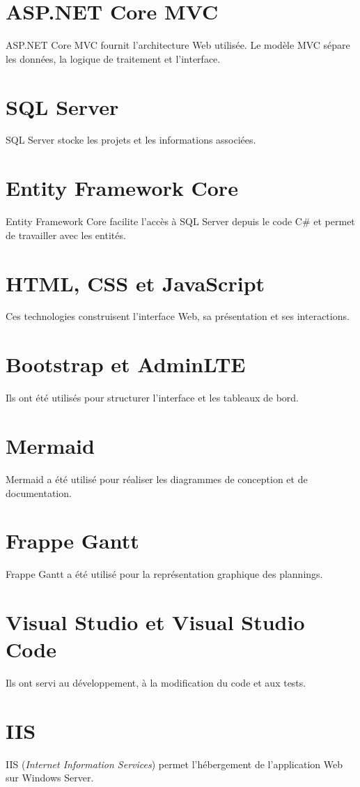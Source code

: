 \documentclass[12pt,a4paper,oneside]{report}
\begin{document}
\section{ASP.NET Core MVC}
ASP.NET Core MVC fournit l'architecture Web utilisée. Le modèle MVC sépare les données, la logique de traitement et l'interface.

\section{SQL Server}
SQL Server stocke les projets et les informations associées.

\section{Entity Framework Core}
Entity Framework Core facilite l'accès à SQL Server depuis le code C\# et permet de travailler avec les entités.

\section{HTML, CSS et JavaScript}
Ces technologies construisent l'interface Web, sa présentation et ses interactions.

\section{Bootstrap et AdminLTE}
Ils ont été utilisés pour structurer l'interface et les tableaux de bord.

\section{Mermaid}
Mermaid a été utilisé pour réaliser les diagrammes de conception et de documentation.

\section{Frappe Gantt}
Frappe Gantt a été utilisé pour la représentation graphique des plannings.

\section{Visual Studio et Visual Studio Code}
Ils ont servi au développement, à la modification du code et aux tests.

\section{IIS}
IIS (\textit{Internet Information Services}) permet l'hébergement de l'application Web sur Windows Server.
\end{document}
